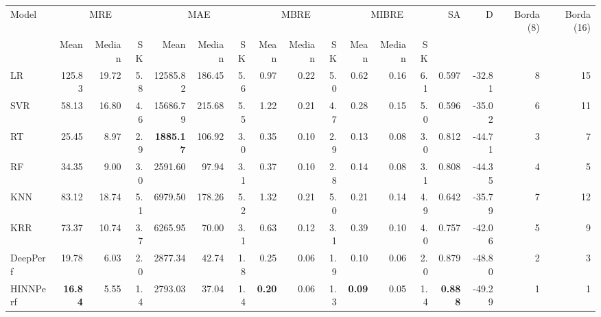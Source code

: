\begin{tabular}{lrrrrrrrrrrrrrrrr}
\toprule
Model & \multicolumn{3}{c}{MRE} & \multicolumn{3}{c}{MAE} & \multicolumn{3}{c}{MBRE} & \multicolumn{3}{c}{MIBRE} & SA & D & Borda (8) & Borda (16) \\
 & Mean & Median & SK & Mean & Median & SK & Mean & Median & SK & Mean & Median & SK &  &  &  &  \\
\midrule
LR & 125.83 & 19.72 & 5.8 & 12585.82 & 186.45 & 5.6 & 0.97 & 0.22 & 5.0 & 0.62 & 0.16 & 6.1 & 0.597 & -32.81 & 8 & 15 \\
SVR & 58.13 & 16.80 & 4.6 & 15686.79 & 215.68 & 5.5 & 1.22 & 0.21 & 4.7 & 0.28 & 0.15 & 5.0 & 0.596 & -35.02 & 6 & 11 \\
RT & 25.45 & 8.97 & 2.9 & \textbf{1885.17} & 106.92 & 3.0 & 0.35 & 0.10 & 2.9 & 0.13 & 0.08 & 3.0 & 0.812 & -44.71 & 3 & 7 \\
RF & 34.35 & 9.00 & 3.0 & 2591.60 & 97.94 & 3.1 & 0.37 & 0.10 & 2.8 & 0.14 & 0.08 & 3.1 & 0.808 & -44.35 & 4 & 5 \\
KNN & 83.12 & 18.74 & 5.1 & 6979.50 & 178.26 & 5.2 & 1.32 & 0.21 & 5.0 & 0.21 & 0.14 & 4.9 & 0.642 & -35.79 & 7 & 12 \\
KRR & 73.37 & 10.74 & 3.7 & 6265.95 & 70.00 & 3.1 & 0.63 & 0.12 & 3.1 & 0.39 & 0.10 & 4.0 & 0.757 & -42.06 & 5 & 9 \\
DeepPerf & 19.78 & 6.03 & 2.0 & 2877.34 & 42.74 & 1.8 & 0.25 & 0.06 & 1.9 & 0.10 & 0.06 & 2.0 & 0.879 & -48.80 & 2 & 3 \\
HINNPerf & \textbf{16.84} & 5.55 & 1.4 & 2793.03 & 37.04 & 1.4 & \textbf{0.20} & 0.06 & 1.3 & \textbf{0.09} & 0.05 & 1.4 & \textbf{0.888} & -49.29 & 1 & 1 \\
\bottomrule
\end{tabular}
